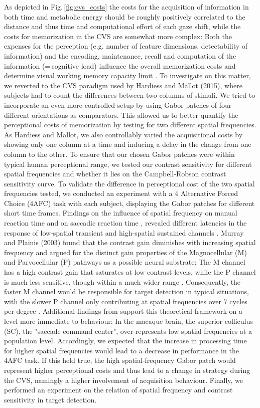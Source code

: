 As depicted in Fig.\,\ref{fig:cvs_costs} the costs for the acquisition of information in both time and metabolic energy should be roughly positively correlated to the distance and thus time and computational effort of each gaze shift, while the costs for memorization in the CVS are somewhat more complex: Both the expenses for the perception (e.g. number of feature dimensions, detectability of information) and the encoding, maintenance, recall and computation of the information (=\,cognitive load) influence the overall memorization costs and determine visual working memory capacity limit \citep{alvarezCapacityVisualShortterm2004}. 
To investigate on this matter, we reverted to the CVS paradigm used by Hardiess and Mallot (2015), where subjects had to count the differences between two columns of stimuli. We tried to incorporate an even more controlled setup by using Gabor patches of four different orientations as comparators. This allowed us to better quantify the perceptional costs of memorization by testing for two different spatial frequencies. As Hardiess and Mallot, we also controllably varied the acquisitional costs by showing only one column at a time and inducing a delay in the change from one column to the other. To ensure that our chosen Gabor patches were within typical human perceptional range, we tested our contrast sensitivity for different spatial frequencies and whether it lies on the Campbell-Robson contrast sensitivity curve. 
 \newline
To validate the difference in perceptional cost of the two spatial frequencies tested, we conducted an experiment with a 4 Alternative Forced Choice (4AFC) task with each subject, displaying the Gabor patches for different short time frames. Findings on the influence of spatial frequency on manual reaction time \citep{breitmeyerSimpleReactionTime1975} and on saccadic reaction time \citep{ludwig2004influence}, revealed different latencies in the response of low-spatial transient and high-spatial sustained channels \citep{breitmeyerSimpleReactionTime1975}. Murray and Plainis (2003) found that the contrast gain diminishes with increasing spatial frequency and argued for the distinct gain properties of the Magnocellular (M) and Parvocellular (P) pathways as a possible neural substrate: The M channel has a high contrast gain that saturates at low contrast levels, while the P channel is much less sensitive, though within a much wider range \citep{kaplan1990new}. Consequently, the faster M channel would be responsible for target detection in typical situations, with the slower P channel only contributing at spatial frequencies over 7 cycles per degree \citep{murrayContrastCodingMagno2003}. Additional findings from \citep{chenSpatialFrequencySensitivity2018} support this theoretical framework on a level more immediate to behaviour: In the macaque brain, the superior colliculus (SC), the "saccade command center", over-represents low spatial frequencies at a population level. Accordingly, we expected that the increase in processing time for higher spatial frequencies would lead to a decrease in performance in the 4AFC task. If this held true, the high spatial-frequency Gabor patch would represent higher perceptional costs and thus lead to a change in strategy during the CVS, namingly a higher involvement of acquisition behaviour. 
 \newline
Finally, we performed an experiment on the relation of spatial frequency and contrast sensitivity in target detection.

